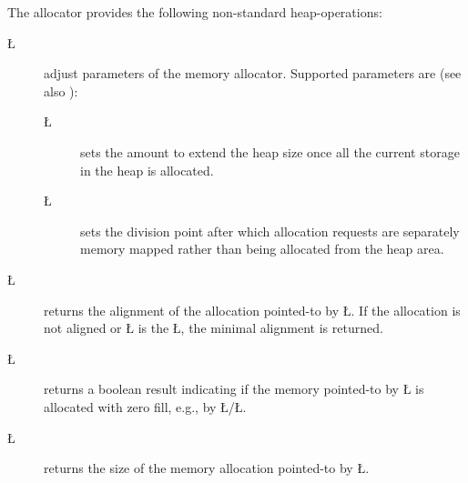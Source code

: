 \documentclass[openright,twoside]{report}
\begin{document}
The \uC allocator provides the following non-standard heap-operations:
\begin{description}
\item[\LGinlinetrue\LGbegin\lgrinde\L{}\endlgrinde\LGend{}] adjust parameters of the memory allocator.
Supported parameters are (see also ):
\begin{description}
\item[\LGinlinetrue\LGbegin\lgrinde\L{}\endlgrinde\LGend{}] sets the amount to extend the heap size once all the current storage in the heap is allocated.
\item[\LGinlinetrue\LGbegin\lgrinde\L{}\endlgrinde\LGend{}] sets the division point after which allocation requests are separately memory mapped rather than being allocated from the heap area.
\end{description}
\item[\LGinlinetrue\LGbegin\lgrinde\L{}\endlgrinde\LGend{}] returns the alignment of the allocation pointed-to by \LGinlinetrue\LGbegin\lgrinde\L{}\endlgrinde\LGend{}.
If the allocation is not aligned or \LGinlinetrue\LGbegin\lgrinde\L{}\endlgrinde\LGend{} is the \LGinlinetrue\LGbegin\lgrinde\L{}\endlgrinde\LGend{}, the minimal alignment is returned.
\item[\LGinlinetrue\LGbegin\lgrinde\L{}\endlgrinde\LGend{}] returns a boolean result indicating if the memory pointed-to by \LGinlinetrue\LGbegin\lgrinde\L{}\endlgrinde\LGend{} is allocated with zero fill, e.g., by \LGinlinetrue\LGbegin\lgrinde\L{}\endlgrinde\LGend{}/\LGinlinetrue\LGbegin\lgrinde\L{}\endlgrinde\LGend{}.
\item[\LGinlinetrue\LGbegin\lgrinde\L{}\endlgrinde\LGend{}] returns the size of the memory allocation pointed-to by \LGinlinetrue\LGbegin\lgrinde\L{}\endlgrinde\LGend{}.

\end{description}
\end{document}
